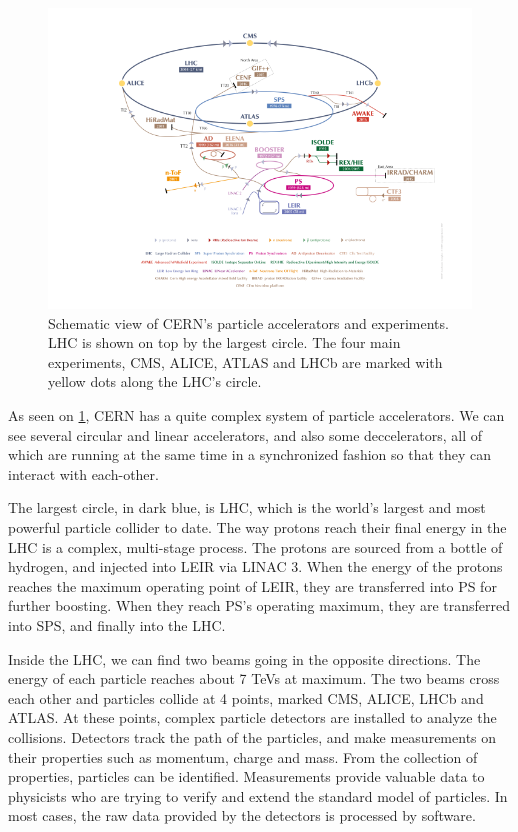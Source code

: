 \documentclass[12pt]{article}
\begin{document}
\begin{figure}[H]
	\includegraphics[width=\textwidth]{accelerator_complex}
	\caption{Schematic view of CERN's particle accelerators and experiments. LHC is shown on top by the largest circle. The four main experiments, CMS, ALICE, ATLAS and LHCb are marked with yellow dots along the LHC's circle.\cite{cern_accel_complex}}
	\label{fig_accel_complex}
\end{figure}

As seen on \ref{fig_accel_complex}, CERN has a quite complex system of particle accelerators. We can see several circular and linear accelerators, and also some deccelerators, all of which are running at the same time in a synchronized fashion so that they can interact with each-other.

The largest circle, in dark blue, is LHC, which is the world's largest and most powerful particle collider to date. The way protons reach their final energy in the LHC is a complex, multi-stage process. The protons are sourced from a bottle of hydrogen, and injected into LEIR via LINAC 3. When the energy of the protons reaches the maximum operating point of LEIR, they are transferred into PS for further boosting. When they reach PS's operating maximum, they are transferred into SPS, and finally into the LHC.

Inside the LHC, we can find two beams going in the opposite directions. The energy of each particle reaches about 7 TeVs at maximum. The two beams cross each other and particles collide at 4 points, marked CMS, ALICE, LHCb and ATLAS. At these points, complex particle detectors are installed to analyze the collisions. Detectors track the path of the particles, and make measurements on their properties such as momentum, charge and mass. From the collection of properties, particles can be identified. Measurements provide valuable data to physicists who are trying to verify and extend the standard model of particles. In most cases, the raw data provided by the detectors is processed by software.
\end{document}
